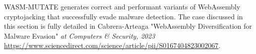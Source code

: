\begin{tcolorbox}[title=Contribution paper,boxrule=1pt,arc=.2em,boxsep=1.0mm]
    WASM-MUTATE generates correct and performant variants of WebAssembly cryptojacking that successfully evade malware detection.
    The case discussed in this section is fully detailed in Cabrera-Arteaga \etal "WebAssembly Diversification for Malware Evasion"
    \emph{at Computers \& Security, 2023}
    \url{https://www.sciencedirect.com/science/article/pii/S0167404823002067}. 
\end{tcolorbox}


